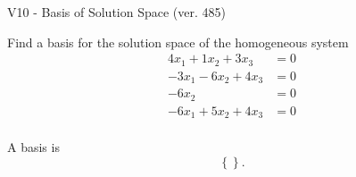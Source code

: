 \begin{exercise}
  \begin{exerciseTitle}V10 - Basis of Solution Space (ver. 485)\end{exerciseTitle}
  \begin{exerciseStatement}
    Find a basis for the solution space of the homogeneous system 
\begin{align*}
 4 x_ 1 + 1 x_ 2 + 3 x_ 3 &= 0  \\ 
  -3 x_ 1 -6 x_ 2 + 4 x_ 3 &= 0  \\ 
  -6 x_ 2 &= 0  \\ 
  -6 x_ 1 + 5 x_ 2 + 4 x_ 3 &= 0  \\ 
 \end{align*}


 
  \end{exerciseStatement}

  \begin{exerciseAnswer}
   A basis is   
\[\left\{\right\}.\]

  


  \end{exerciseAnswer}
\end{exercise}